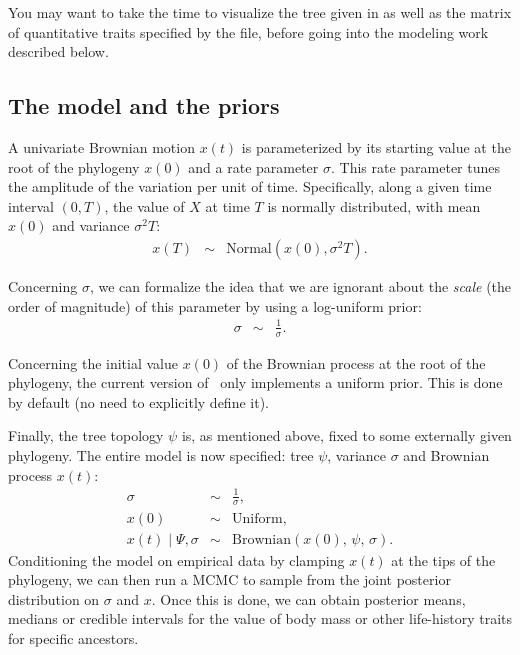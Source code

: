 You may want to take the time to visualize the tree given in  as well as the matrix of quantitative traits specified by the  file, before going into the modeling work described below.

\subsection{The model and the priors}

A univariate Brownian motion $x(t)$ is parameterized by its starting value at the root of the phylogeny $x(0)$ and a rate parameter $\sigma$. This rate parameter tunes the amplitude of the variation per unit of time. Specifically, along a given time interval $(0,T)$, the value of $X$ at time $T$ is normally distributed, with mean $x(0)$ and variance $\sigma^2 T$:
\begin{eqnarray*}
x(T) &\sim& \text{Normal} \left( x(0), \sigma^2 T \right).
\end{eqnarray*}

Concerning $\sigma$, we can formalize the idea that we are ignorant about the \emph{scale} (the order of magnitude) of this parameter by using a log-uniform prior:
\begin{eqnarray*}
\sigma &\sim& \frac{1}{\sigma}.
\end{eqnarray*}

Concerning the initial value $x(0)$ of the Brownian process at the root of the phylogeny,
the current version of \RevBayes~only implements a uniform prior.
This is done by default (no need to explicitly define it).

Finally, the tree topology $\psi$ is, as mentioned above, fixed to some externally given phylogeny.
The entire model is now specified: tree $\psi$, variance $\sigma$ and Brownian process $x(t)$:
\begin{eqnarray*}
\sigma &\sim& \frac{1}{\sigma},
\\
x(0) &\sim& \text{Uniform},
\\
x(t) \mid \Psi, \sigma &\sim& \text{Brownian} \left( x(0), \, \psi, \, \sigma \right).
\end{eqnarray*}
Conditioning the model on empirical data by clamping $x(t)$ at the tips of the phylogeny, we can then run a MCMC to sample from the joint posterior distribution on $\sigma$ and $x$. Once this is done, we can obtain posterior means, medians or credible intervals for the value of body mass or other life-history traits for specific ancestors.


